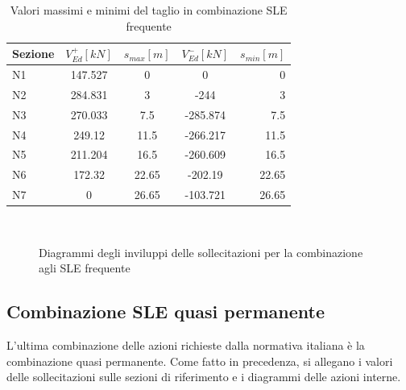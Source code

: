 \begin{table}[ht!]
	\centering
	\caption{Valori massimi e minimi del taglio in combinazione SLE frequente}
	\label{tab:shear_sleFreq}
    \begin{tabular*}{\textwidth}{l @{\extracolsep{\fill}} cccr}
\toprule
Sezione &  $V_{Ed}^+ [kN]$ &  $s_{max} [m]$ &  $V_{Ed}^- [kN]$ &  $s_{min} [m] $\\
\midrule
N1      &   147.527 &        0 &         0 &        0 \\
N2      &   284.831 &        3 &      -244 &        3 \\
N3      &   270.033 &      7.5 &  -285.874 &      7.5 \\
N4      &    249.12 &     11.5 &  -266.217 &     11.5 \\
N5      &   211.204 &     16.5 &  -260.609 &     16.5 \\
N6      &    172.32 &    22.65 &   -202.19 &    22.65 \\
N7      &         0 &    26.65 &  -103.721 &    26.65 \\
\bottomrule
    \end{tabular*}
\end{table}




\begin{figure}
 \centering
 \\
    
 \caption{Diagrammi degli inviluppi delle sollecitazioni per la combinazione agli SLE frequente}
 \label{fig:envelope_sleFreq}
\end{figure}

\cleardoublepage
\subsection{Combinazione SLE quasi permanente}

L'ultima combinazione delle azioni richieste dalla normativa italiana è la combinazione quasi permanente. Come fatto in precedenza, si allegano i valori delle sollecitazioni sulle sezioni di riferimento e i diagrammi delle azioni interne.

